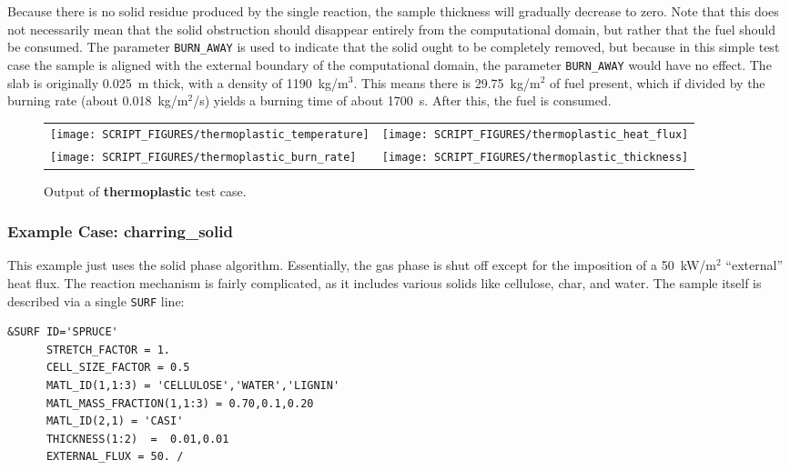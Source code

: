 \documentclass[11pt]{book}
\newcommand{\ct}{\tt\small}
\begin{document}
Because there is no solid residue produced by the single reaction, the sample thickness will gradually
decrease to zero. Note that this does not necessarily mean that the solid obstruction should disappear entirely from
the computational domain, but rather that the fuel should be consumed. The parameter {\ct BURN\_AWAY}
is used to indicate that the solid ought to be completely removed, but because in this simple test case the
sample is aligned with the external boundary of the computational domain, the parameter {\ct BURN\_AWAY}
would have no effect.
The slab is originally 0.025~m thick, with a density of 1190~kg/m$^3$.
This means there is 29.75~kg/m$^2$ of fuel present, which if divided by the
burning rate (about 0.018~kg/m$^2$/s) yields a burning time of about 1700~s.
After this, the fuel is consumed.


\begin{figure}[ht]
\begin{tabular*}{\textwidth}{lr}
\texttt{[image: SCRIPT\_FIGURES/thermoplastic\_temperature]} &
\texttt{[image: SCRIPT\_FIGURES/thermoplastic\_heat\_flux]} \\
\texttt{[image: SCRIPT\_FIGURES/thermoplastic\_burn\_rate]} &
\texttt{[image: SCRIPT\_FIGURES/thermoplastic\_thickness]}
\end{tabular*}
\caption[Output of {\bf thermoplastic} test case.]{Output of {\bf thermoplastic} test case.}
\label{thermoplastic}
\end{figure}

\newpage

\subsubsection{Example Case: {\bf charring\_solid}}

This example just uses the solid phase algorithm.
Essentially, the gas phase is shut off except for the imposition
of a 50~kW/m$^2$ ``external'' heat flux. The reaction mechanism is
fairly complicated, as it includes various solids like cellulose,
char, and water. The sample itself is described via a single {\ct SURF} line:

\scriptsize
\begin{verbatim}
&SURF ID='SPRUCE'
      STRETCH_FACTOR = 1.
      CELL_SIZE_FACTOR = 0.5
      MATL_ID(1,1:3) = 'CELLULOSE','WATER','LIGNIN'
      MATL_MASS_FRACTION(1,1:3) = 0.70,0.1,0.20
      MATL_ID(2,1) = 'CASI'
      THICKNESS(1:2)  =  0.01,0.01
      EXTERNAL_FLUX = 50. /
\end{verbatim} \normalsize
\end{document}
